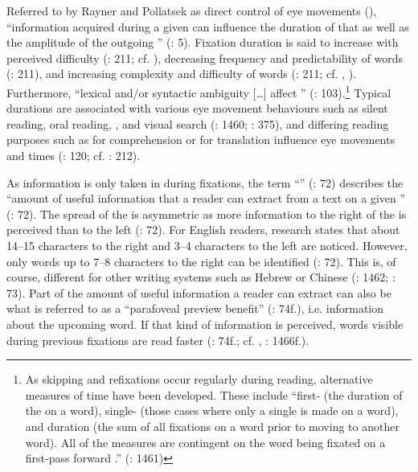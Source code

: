 Referred to by Rayner and Pollatsek as direct control of eye movements (\citeyear{rayner1989}), “information acquired during a given  can influence the duration of that  as well as the amplitude of the outgoing ” (\citealt{radach-kennedy2004}: 5). Fixation duration is said to increase with perceived difficulty (\citealt{Hvelplund2014}: 211; cf. \citealt{rayner1986}), decreasing frequency and predictability of words (\citealt{Hvelplund2014}: 211), and increasing complexity and difficulty of words (\citealt{Hvelplund2014}: 211; cf. \citealt{rayner1989}, \citealt{rayner1986}). Furthermore, “lexical and/or syntactic ambiguity […] affect ” (\citealt{Jakobsen2008}: 103).\footnote{As skipping and refixations occur regularly during reading, alternative measures of  time have been developed. These include “first- (the duration of the  on a word), single- (those cases where only a single  is made on a word), and  duration (the sum of all fixations on a word prior to moving to another word). All of the measures are contingent on the word being fixated on a first-pass forward .” (\citealt{rayner2009}: 1461)} Typical  durations are associated with various eye movement behaviours such as silent reading, oral reading, , and visual search (\citealt{rayner2009}: 1460; \citealt{rayner1998}: 375), and differing reading purposes such as for comprehension or for translation influence eye movements and  times (\citealt{Jakobsen2008}: 120; cf. \citealt{Hvelplund2014}: 212).

As information is only taken in during fixations, the term “” (\citealt{Keating2014}: 72) describes the “amount of useful information that a reader can extract from a text on a given ” (\citeyear{Keating2014}: 72). The spread of the  is asymmetric as more information to the right of the  is perceived than to the left (\citeyear{Keating2014}: 72). For English readers, research states that about 14--15 characters to the right and 3--4 characters to the left are noticed. However, only words up to 7--8 characters to the right can be identified (\citeyear{Keating2014}: 72). This is, of course, different for other writing systems such as Hebrew or Chinese (\citealt{rayner2009}: 1462; \citealt{Keating2014}: 73). Part of the amount of useful information a reader can extract can also be what is referred to as a “parafoveal preview benefit” (\citealt{Keating2014}: 74f.), i.e. information about the upcoming word. If that kind of information is perceived, words visible during previous fixations are read faster (\citealt{Keating2014}: 74f.; cf. \citealt{rayner1998}, \citealt{rayner2009}: 1466f.).

